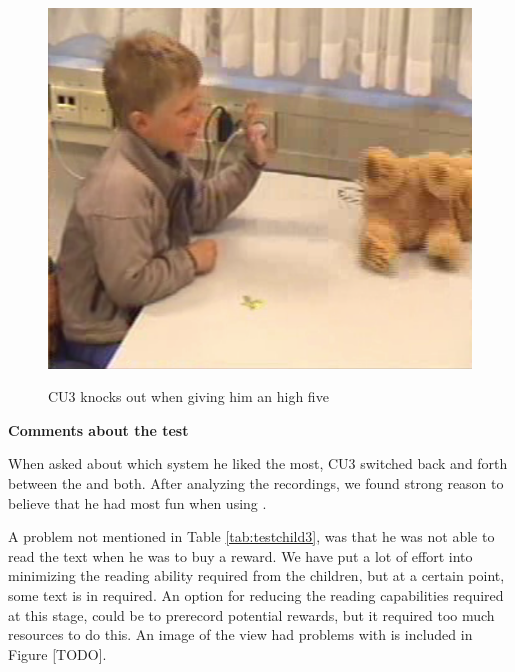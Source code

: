 \begin{figure}
\begin{minipage}[t]{0.3\linewidth}
		\label{fig:child-knockout2}
	\end{minipage}
	\hspace{0.5cm}
	\begin{minipage}[t]{0.3\linewidth}
		\centering
			\includegraphics[width=0.20\paperwidth]{Pictures/usability-pictures/knockout3.png}
		\label{fig:child-knockout3}
	\end{minipage}
	\label{fig:child-knockout}
	\caption{CU3 knocks out \ab{} when giving him an high five}
\end{figure}

\textbf{Comments about the test}

When asked about which system he liked the most, CU3 switched back and forth between the \app{} and both. After analyzing the recordings, we found strong reason to believe that he had most fun when using \app{}. 

A problem not mentioned in Table \ref{tab:testchild3}, was that he was not able to read the text when he was to buy a reward. We have put a lot of effort into minimizing the reading ability required from the children, but at a certain point, some text is in required. An option for reducing the reading capabilities required at this stage, could be to prerecord potential rewards, but  it required too much resources to do this. An image of the view had problems with is included in Figure [TODO].   
 